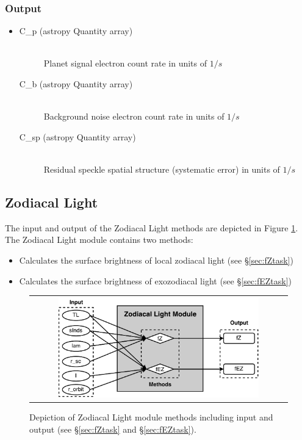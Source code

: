 \documentclass[cleanfoot]{asme2ej}
\newcommand{\reffig}[1]{Figure \ref{#1}}
\begin{document}
\subsubsection*{Output}
\begin{itemize}
\item 
\begin{description}
    \item[C\_p (astropy Quantity array)] \hfill \\ Planet signal electron count rate in units of $ 1/s $
    \item[C\_b (astropy Quantity array)] \hfill \\ Background noise electron count rate in units of $ 1/s $
    \item[C\_sp (astropy Quantity array)] \hfill \\ Residual speckle spatial structure (systematic error) in units of $ 1/s $
\end{description}
\end{itemize}



\subsection{Zodiacal Light}\label{sec:zodiacallight}

The input and output of the Zodiacal Light methods are depicted in \reffig{fig:zodiacallightmodule}. The Zodiacal Light module contains two methods:
\begin{itemize}[leftmargin=1in,font={\ttfamily}]
    \item[\texttt fZ] Calculates the surface brightness of local zodiacal light  (see \S\ref{sec:fZtask})
    \item[\texttt fEZ] Calculates the surface brightness of exozodiacal light (see \S\ref{sec:fEZtask})
\end{itemize}

\begin{figure}[ht]
    \begin{center}
        \begin{tabular}{c}
             \includegraphics[width=0.8\textwidth]{ZodiTasks2}
        \end{tabular}
    \end{center}
    \caption{\label{fig:zodiacallightmodule} Depiction of Zodiacal Light module methods including input and output (see \S\ref{sec:fZtask} and \S\ref{sec:fEZtask}).}
\end{figure}
\end{document}
